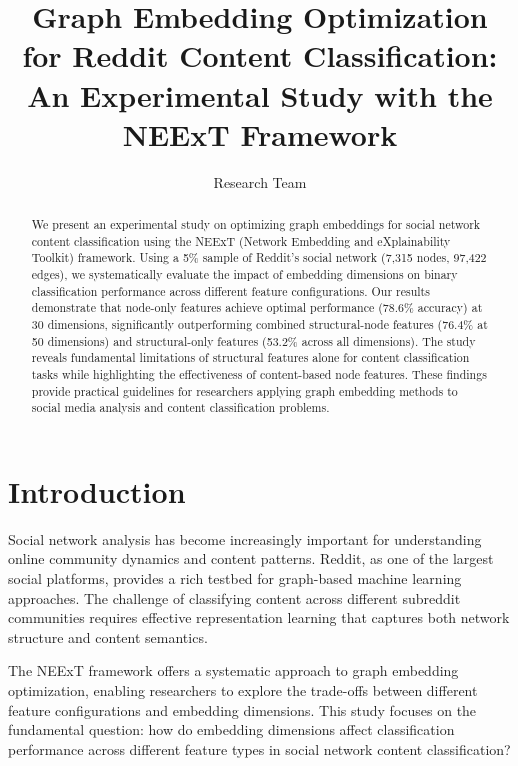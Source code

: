 \documentclass[linenumbers]{aastex701}
\begin{document}
\title{Graph Embedding Optimization for Reddit Content Classification: An Experimental Study with the NEExT Framework}

\author{Research Team}

\begin{abstract}
We present an experimental study on optimizing graph embeddings for social network content classification using the NEExT (Network Embedding and eXplainability Toolkit) framework. Using a 5\% sample of Reddit's social network (7,315 nodes, 97,422 edges), we systematically evaluate the impact of embedding dimensions on binary classification performance across different feature configurations. Our results demonstrate that node-only features achieve optimal performance (78.6\% accuracy) at 30 dimensions, significantly outperforming combined structural-node features (76.4\% at 50 dimensions) and structural-only features (53.2\% across all dimensions). The study reveals fundamental limitations of structural features alone for content classification tasks while highlighting the effectiveness of content-based node features. These findings provide practical guidelines for researchers applying graph embedding methods to social media analysis and content classification problems.
\end{abstract}


\section{Introduction} \label{sec:intro}

Social network analysis has become increasingly important for understanding online community dynamics and content patterns. Reddit, as one of the largest social platforms, provides a rich testbed for graph-based machine learning approaches. The challenge of classifying content across different subreddit communities requires effective representation learning that captures both network structure and content semantics.

The NEExT framework offers a systematic approach to graph embedding optimization, enabling researchers to explore the trade-offs between different feature configurations and embedding dimensions. This study focuses on the fundamental question: how do embedding dimensions affect classification performance across different feature types in social network content classification?
\end{document}
